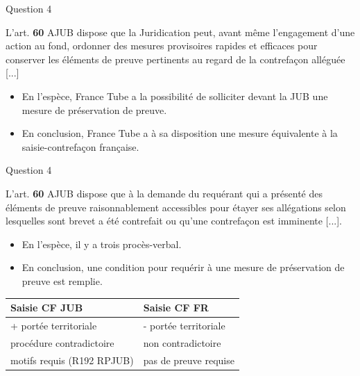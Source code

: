 \begin{frame}{Question 4}

\begin{block}{}
L'art. \textbf{60} AJUB dispose que la Juridication peut, avant même
l'engagement d'une action au fond, ordonner des mesures provisoires rapides
et efficaces pour conserver les éléments de preuve pertinents au regard
de la contrefaçon alléguée [...]
\end{block}

\begin{itemize}
  \item En l'espèce, France Tube a la possibilité de solliciter devant la JUB une mesure de préservation de preuve.
  \item En conclusion, France Tube a à sa disposition une mesure équivalente à la saisie-contrefaçon française.
\end{itemize}

\end{frame}


\begin{frame}{Question 4}
  
\begin{block}{}
L'art. \textbf{60} AJUB dispose que à la demande du requérant
qui a présenté des éléments de preuve raisonnablement accessibles
pour étayer ses allégations selon lesquelles sont brevet a
été contrefait ou qu'une contrefaçon est imminente [...].
\end{block}

\begin{itemize}
  \item En l'espèce, il y a trois procès-verbal.
  \item En conclusion, une condition pour requérir à une mesure de préservation de preuve
  est remplie.
\end{itemize}

  \begin{table}[h]
\centering
\begin{tabular}{l l}
  Saisie CF JUB & Saisie CF FR \\
  \hline
  + portée territoriale & - portée territoriale\\
  procédure contradictoire & non contradictoire \\
  motifs requis (R192 RPJUB) & pas de preuve requise \\
\end{tabular}
\end{table}
\end{frame}